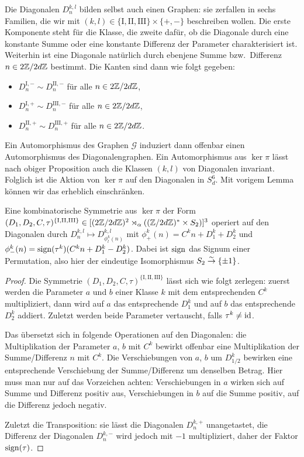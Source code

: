 Die Diagonalen $D_n^{k,l}$ bilden selbst auch einen Graphen: sie zerfallen in sechs Familien, die wir mit $(k,l) \in \{\mathrm{I}, \mathrm{II}, \mathrm{III}\} \times \{+,-\}$ beschreiben wollen. Die erste Komponente steht für die Klasse, die zweite dafür, ob die Diagonale durch eine konstante Summe oder eine konstante Differenz der Parameter charakterisiert ist. Weiterhin ist eine Diagonale natürlich durch ebenjene Summe bzw.~Differenz $n \in 2\Zmod 2dZ$ bestimmt. Die Kanten sind dann wie folgt gegeben:
\begin{itemize}
\item $D_n^{\mathrm{I},-} \sim D_n^{\mathrm{II},-}$ für alle $n \in 2\Zmod 2dZ$,
\item $D_n^{\mathrm{I},+} \sim D_n^{\mathrm{III},-}$ für alle $n \in 2\Zmod 2dZ$,
\item $D_n^{\mathrm{II},+} \sim D_n^{\mathrm{III},+}$ für alle $n \in 2\Zmod 2dZ$.
\end{itemize}
Ein Automorphismus des Graphen $\mathcal G$ induziert dann offenbar einen Automorphismus des Diagonalengraphen. Ein Automorphismus aus $\ker \pi$ lässt nach obiger Proposition auch die Klassen $(k,l)$ von Diagonalen invariant. Folglich ist die Aktion von $\ker \pi$ auf den Diagonalen in $S_d^6$. Mit vorigem Lemma können wir das erheblich einschränken.

\begin{lemma}
Eine kombinatorische Symmetrie aus $\ker \pi$ der Form $(D_1, D_2, C, \tau)^{\{\mathrm{I, II, III}\}} \in [(2\Zmod 2dZ)^2 \rtimes_\alpha ((\Zmod 2dZ)^* \times S_2)]^3$ operiert auf den Diagonalen durch $D_n^{k,l} \mapsto D_{\phi_l^k(n)}^{k,l}$ mit $\phi_+^k(n) = C^k n + D_1^k + D_2^k$ und $\phi_-^k(n) = \operatorname{sign}(\tau^k)(C^k n + D_1^k - D_2^k)$. Dabei ist $\operatorname{sign}$ das Signum einer Permutation, also hier der eindeutige Isomorphismus $S_2 \overrel\to^\sim \{\pm 1\}$.
\end{lemma}
\begin{proof}
Die Symmetrie $(D_1, D_2, C, \tau)^{\{\mathrm{I, II, III}\}}$ lässt sich wie folgt zerlegen: zuerst werden die Parameter $a$ und $b$ einer Klasse $k$ mit dem entsprechenden $C^k$ multipliziert, dann wird auf $a$ das entsprechende $D_1^k$ und auf $b$ das entsprechende $D_2^k$ addiert. Zuletzt werden beide Parameter vertauscht, falls $\tau^k \neq \operatorname{id}$.

Das übersetzt sich in folgende Operationen auf den Diagonalen: die Multiplikation der Parameter $a$, $b$ mit $C^k$ bewirkt offenbar eine Multiplikation der Summe/Differenz $n$ mit $C^k$. Die Verschiebungen von $a$, $b$ um $D_{1/2}^k$ bewirken eine entsprechende Verschiebung der Summe/Differenz um denselben Betrag. Hier muss man nur auf das Vorzeichen achten: Verschiebungen in $a$ wirken sich auf Summe und Differenz positiv aus, Verschiebungen in $b$ auf die Summe positiv, auf die Differenz jedoch negativ.

Zuletzt die Transposition: sie lässt die Diagonalen $D_n^{k,+}$ unangetastet, die Differenz der Diagonalen $D_n^{k,-}$ wird jedoch mit $-1$ multipliziert, daher der Faktor $\operatorname{sign}(\tau)$.
\end{proof}

